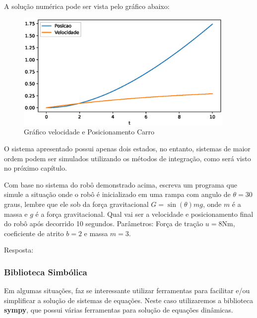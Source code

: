 A solução numérica pode ser vista pelo gráfico abaixo:

\begin{figure}[htb]
    \includegraphics[width=300pt]{chapters/chapter0/figures/exercice_car.eps}
    \caption[Modelo Dinâmico Carro]{Gráfico velocidade e Posicionamento Carro}
\end{figure}

O sistema apresentado possui apenas dois estados, no entanto, sistemas de maior ordem podem ser
simulados utilizando os métodos de integração, como será visto no próximo capítulo.

\begin{shortbox}
    Com base no sistema do robô demonstrado acima, escreva um programa que simule a situação onde o robô é inicializado em uma rampa com angulo de $\theta=30$ graus, lembre que ele sob da força gravitacional $G=\sin(\theta)mg$, onde $m$ é a massa e $g$ é a
    força gravitacional. Qual vai ser a velocidade e posicionamento final do robô após decorrido 10 segundos. Parâmetros: Força de tração $u=8\text{Nm}$,
    coeficiente de atrito $b=2$ e massa $m=3$.
    \begin{center}
        Resposta:

\end{center}

\end{shortbox}

\subsubsection{Biblioteca Simbólica}

Em algumas situações, faz se interessante utilizar ferramentas para facilitar e/ou simplificar a solução de sistemas de equações. Neste caso utilizaremos a biblioteca \textbf{sympy}, que possui várias ferramentas para solução de equações dinâmicas.

